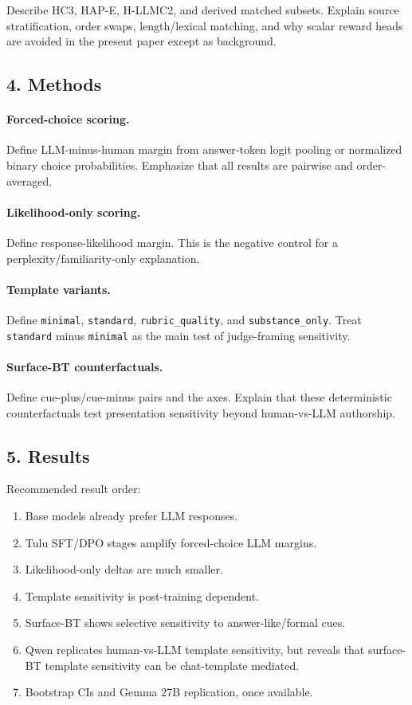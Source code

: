 \documentclass[11pt]{article}
\begin{document}
Describe HC3, HAP-E, H-LLMC2, and derived matched subsets. Explain source
stratification, order swaps, length/lexical matching, and why scalar reward
heads are avoided in the present paper except as background.

\subsection{4. Methods}

\paragraph{Forced-choice scoring.}
Define LLM-minus-human margin from answer-token logit pooling or normalized
binary choice probabilities. Emphasize that all results are pairwise and
order-averaged.

\paragraph{Likelihood-only scoring.}
Define response-likelihood margin. This is the negative control for a
perplexity/familiarity-only explanation.

\paragraph{Template variants.}
Define \texttt{minimal}, \texttt{standard}, \texttt{rubric\_quality}, and
\texttt{substance\_only}. Treat \texttt{standard} minus \texttt{minimal} as the
main test of judge-framing sensitivity.

\paragraph{Surface-BT counterfactuals.}
Define cue-plus/cue-minus pairs and the axes. Explain that these deterministic
counterfactuals test presentation sensitivity beyond human-vs-LLM authorship.

\subsection{5. Results}

Recommended result order:

\begin{enumerate}[leftmargin=1.5em]
\item Base models already prefer LLM responses.
\item Tulu SFT/DPO stages amplify forced-choice LLM margins.
\item Likelihood-only deltas are much smaller.
\item Template sensitivity is post-training dependent.
\item Surface-BT shows selective sensitivity to answer-like/formal cues.
\item Qwen replicates human-vs-LLM template sensitivity, but reveals that
surface-BT template sensitivity can be chat-template mediated.
\item Bootstrap CIs and Gemma 27B replication, once available.
\end{enumerate}
\end{document}

